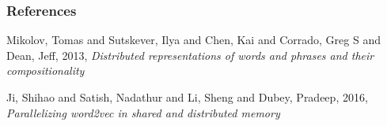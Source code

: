 %
%

\begin{frame} \frametitle{References}
\begin{thebibliography}{xx}\footnotesize

 {\sc Mikolov, Tomas and Sutskever, Ilya and Chen, Kai and Corrado, Greg S and Dean, Jeff}, 2013, {\em Distributed representations of words and phrases and their compositionality }

 {\sc Ji, Shihao and Satish, Nadathur and Li, Sheng and Dubey, Pradeep}, 2016, {\em Parallelizing word2vec in shared and distributed memory}



\end{thebibliography}
\end{frame}